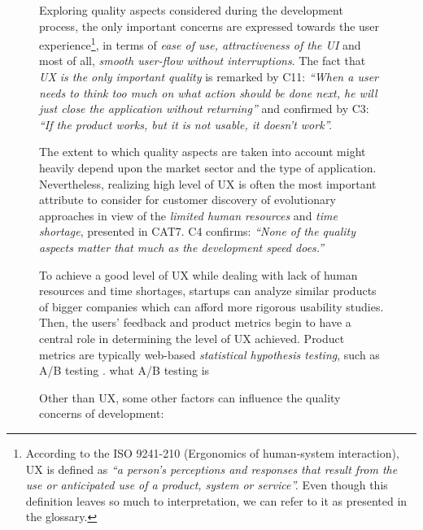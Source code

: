 \documentclass[12pt,journal,compsoc]{../sty/IEEEtran}
\begin{document}
\begin{table}[!t]
\begin{figure}[!t]
Exploring quality aspects considered during the development process, the only
important concerns are expressed towards the user experience\footnote{According
to the ISO 9241-210 (Ergonomics of human-system interaction), UX is defined as
\textit{``a person's perceptions and responses that result from the use or
anticipated use of a product, system or service''.} Even though this definition
leaves so much to interpretation, we can refer to it as presented in the
glossary.}, in terms of \textit{ease of use, attractiveness of the UI} and most
of all, \textit{smooth user-flow without interruptions}. The fact that
\textit{UX is the only important quality} is remarked by C11: \textit{``When a
user needs to think too much on what action should be done next, he will just
close the application without returning''} and confirmed by C3: \textit{``If the
product works, but it is not usable, it doesn't work''.}

The extent to which quality aspects are taken into account might heavily depend
upon the market sector and the type of application. Nevertheless, realizing high
level of UX  is often the most important attribute to consider for customer
discovery of  evolutionary approaches in view of the \textit{limited human
resources} and \textit{time shortage}, presented in CAT7. C4 confirms:
\textit{``None of the quality aspects matter that much as the development speed
does.''}

To achieve a good level of UX while dealing with lack of human resources and
time shortages, startups can analyze similar products of bigger companies which
can afford more rigorous usability studies. Then, the users' feedback and
product metrics begin to have a central role in determining the level of UX
achieved. Product metrics are typically web-based \textit{statistical hypothesis
testing}, such as A/B testing \cite{AB}.  %
what A/B testing is %

Other than UX, some other factors can influence the quality concerns of
development:


\begin{compactitem}


\end{compactitem}
\end{figure}
\end{table}
\end{document}
